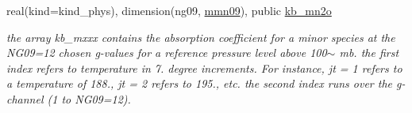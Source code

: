 \begin{Indent}
\begin{DoxyCompactItemize}
real(kind=kind\+\_\+phys), dimension(ng09, \hyperlink{group__module__radlw__kgbnn_gaa9c8294b56ac3ce90b07114e986777a9}{mmn09}), public \hyperlink{group__module__radlw__kgbnn_ga79326139db789012d47c4750917c2cdb}{kb\+\_\+mn2o}
\begin{DoxyCompactList}\small\item\em the array kb\+\_\+mxxx contains the absorption coefficient for a minor species at the N\+G09=12 chosen g-\/values for a reference pressure level above 100$\sim$ mb. the first index refers to temperature in 7. degree increments. For instance, jt = 1 refers to a temperature of 188., jt = 2 refers to 195., etc. the second index runs over the g-\/channel (1 to N\+G09=12). \end{DoxyCompactList}\end{DoxyCompactItemize}
\end{Indent}

